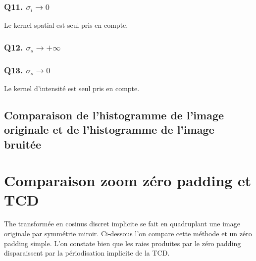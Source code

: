\documentclass{article}
\begin{document}
\subsubsection*{Q11. $\sigma_i \rightarrow 0 $}
Le kernel spatial est seul pris en compte.
\subsubsection*{Q12. $\sigma_s \rightarrow + \infty $}
\subsubsection*{Q13. $\sigma_s \rightarrow 0 $}
Le kernel d'intensité est seul pris en compte.

\subsection*{Comparaison de l'histogramme de l'image originale et de l'histogramme de l'image bruitée}

\section{Comparaison zoom zéro padding et TCD}
The transformée en cosinus discret implicite se fait en quadruplant une image originale par symmétrie miroir. Ci-dessous l'on compare cette méthode et un zéro padding simple. L'on constate bien que les raies produites par le zéro padding disparaissent par la périodisation implicite de la TCD.
\end{document}
